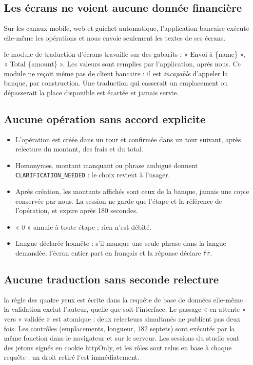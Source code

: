 \documentclass[11pt,a4paper]{article}
\begin{document}
\subsection{Les écrans ne voient aucune donnée financière}
Sur les canaux mobile, web et guichet automatique, l'application bancaire exécute elle-même les opérations et nous envoie seulement les textes de ses écrans.
\begin{solution}
le module de traduction d'écrans travaille sur des gabarits : « Envoi à \{name\} », « Total \{amount\} ». Les valeurs sont remplies par l'application, après nous. Ce module ne reçoit même pas de client bancaire : il est \emph{incapable} d'appeler la banque, par construction. Une traduction qui casserait un emplacement ou dépasserait la place disponible est écartée et jamais servie.
\end{solution}

\subsection{Aucune opération sans accord explicite}
\begin{itemize}
  \item L'opération est créée dans un tour et confirmée dans un tour suivant, après relecture du montant, des frais et du total.
  \item Homonymes, montant manquant ou phrase ambiguë donnent \texttt{CLARIFICATION\_NEEDED} : le choix revient à l'usager.
  \item Après création, les montants affichés sont ceux de la banque, jamais une copie conservée par nous. La session ne garde que l'étape et la référence de l'opération, et expire après 180 secondes.
  \item « 0 » annule à toute étape ; rien n'est débité.
  \item Langue déclarée honnête : s'il manque une seule phrase dans la langue demandée, l'écran entier part en français et la réponse déclare \texttt{fr}.
\end{itemize}

\subsection{Aucune traduction sans seconde relecture}
\begin{solution}
la règle des quatre yeux est écrite dans la requête de base de données elle-même : la validation exclut l'auteur, quelle que soit l'interface. Le passage « en attente » vers « validée » est atomique : deux relecteurs simultanés ne publient pas deux fois. Les contrôles (emplacements, longueur, 182 septets) sont exécutés par la même fonction dans le navigateur et sur le serveur. Les sessions du studio sont des jetons signés en cookie httpOnly, et les rôles sont relus en base à chaque requête : un droit retiré l'est immédiatement.
\end{solution}
\end{document}

